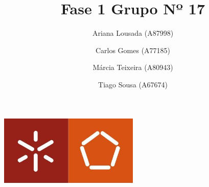 \documentclass[a4paper]{report}
\begin{document}
\title{Fase 1 \break
\large Grupo Nº 17}
\author{Ariana Lousada (A87998) \and Carlos Gomes (A77185) \and Márcia Teixeira (A80943) \and Tiago Sousa (A67674)}

\begin{center}
    \begin{minipage}{0.75\linewidth}
        \centering
        \includegraphics[width=0.5\textwidth]{images/logo.png}\par\vspace{1cm}
        \vspace{1cm}
        \href{https://www.uminho.pt/}
        {\color{black}{\scshape\LARGE Universidade do Minho}}\par\vspace{1cm}
        \href{https://www.di.uminho.pt/}
        {\color{black}{\scshape\Large Departamento de Informática}} \par
        \maketitle
    \end{minipage}
\end{center}
\end{document}
